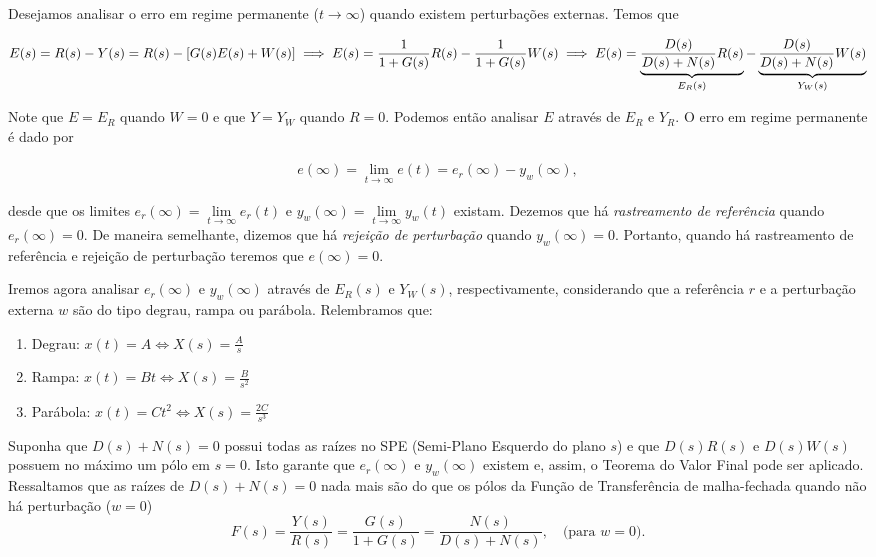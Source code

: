 \documentclass[
]{book}
\providecommand{\tightlist}{%
  \setlength{\itemsep}{0pt}\setlength{\parskip}{0pt}}
\begin{document}
Desejamos analisar o erro em regime permanente (\(t \to \infty\)) quando existem perturbações externas. Temos que

\[
E(s) = R(s) - Y(s) = R(s) - [G(s)E(s) + W(s)]\\
\implies E(s) = \frac {1}{1 + G(s)}R(s) - \frac {1}{1+G(s)}W(s) \\
\implies E(s) = \underbrace{\frac {D(s)}{D(s) + N(s)}R(s)}_{E_R(s)} - \underbrace{\frac {D(s)}{D(s) + N(s)}W(s)}_{Y_W(s)}
\]

Note que \(E = E_R\) quando \(W= 0\) e que \(Y = Y_W\) quando \(R=0\). Podemos então analisar \(E\) através de \(E_R\) e \(Y_R\). O erro em regime permanente é dado por

\begin{align}
e(\infty) = \lim\limits_{t \to \infty}{e(t)} = e_r(\infty) - y_w(\infty), \label{eq:eq41}
\end{align}

desde que os limites \(e_r(\infty) = \lim\limits_{t\to \infty}{e_r(t)}\) e \(y_w(\infty) = \lim\limits_{t \to \infty}{y_w(t)}\) existam. Dezemos que há \emph{rastreamento de referência} quando \(e_r(\infty) = 0\). De maneira semelhante, dizemos que há \emph{rejeição de perturbação} quando \(y_w(\infty) = 0\). Portanto, quando há rastreamento de referência e rejeição de perturbação teremos que \(e(\infty) = 0\).

Iremos agora analisar \(e_r(\infty)\) e \(y_w(\infty)\) através de \(E_R(s)\) e \(Y_W(s)\), respectivamente, considerando que a referência \(r\) e a perturbação externa \(w\) são do tipo degrau, rampa ou parábola. Relembramos que:

\begin{enumerate}
\def\labelenumi{\arabic{enumi}.}
\tightlist
\item
  Degrau: \(x(t) = A \iff X(s) = \frac {A}{s}\)
\item
  Rampa: \(x(t) = Bt \iff X(s) = \frac {B}{s^2}\)
\item
  Parábola: \(x(t) = Ct^2 \iff X(s) = \frac {2C}{s^3}\)
\end{enumerate}

Suponha que \(D(s) + N(s) = 0\) possui todas as raízes no SPE (Semi-Plano Esquerdo do plano \(s\)) e que \(D(s)R(s)\) e \(D(s)W(s)\) possuem no máximo um pólo em \(s=0\). Isto garante que \(e_r(\infty)\) e \(y_w(\infty)\) existem e, assim, o Teorema do Valor Final pode ser aplicado. Ressaltamos que as raízes de \(D(s) + N(s) = 0\) nada mais são do que os pólos da Função de Transferência de malha-fechada quando não há perturbação (\(w=0\))
\[
F(s) = \frac {Y(s)}{R(s)} = \frac{G(s)}{1+G(s)} = \frac {N(s)}{D(s)+N(s)}, \quad \text{(para } w=0 \text{).} 
\]
\end{document}

